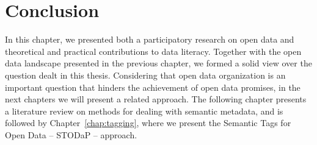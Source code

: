 \section{Conclusion}
\label{dl_conclusion} 

In this chapter, we presented both a participatory research on open data and theoretical and practical contributions to data literacy.
Together with the open data landscape presented in the previous chapter, we formed a solid view over the question dealt in this thesis. 
Considering that open data organization is an important question that hinders the achievement of open data promises, in the next chapters we will present a related approach.
The following chapter presents a literature review on methods for dealing with semantic metadata, and is followed by Chapter~\ref{chap:tagging}, where we present the Semantic Tags for Open Data -- STODaP -- approach.

